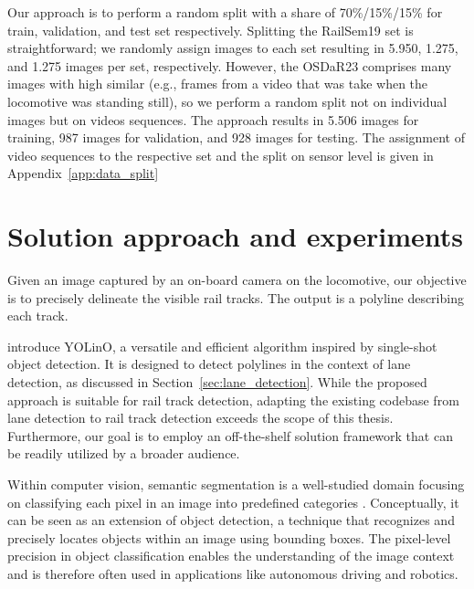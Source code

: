\documentclass[Master,MDS,english]{BASE/twbook} %
\begin{document}
Our approach is to perform a random split with a share of 70\%/15\%/15\% for train, validation, and test set respectively. Splitting the RailSem19 set is straightforward; we randomly assign images to each set resulting in 5.950, 1.275, and 1.275 images per set, respectively. However, the OSDaR23 comprises many images with high similar (e.g., frames from a video that was take when the locomotive was standing still), so we perform a random split not on individual images but on videos sequences. The approach results in 5.506 images for training, 987 images for validation, and 928 images for testing.
The assignment of video sequences to the respective set and the split on sensor level is given in Appendix~\ref{app:data_split}



\chapter{Solution approach and experiments} %

Given an image captured by an on-board camera on the locomotive, our objective is to precisely delineate the visible rail tracks. The output is  a polyline describing each track.

\cite{meyer2021yolino} introduce YOLinO, a versatile and efficient algorithm inspired by single-shot object detection. It is designed to detect polylines in the context of lane detection, as discussed in Section~\ref{sec:lane_detection}. While the proposed approach is suitable for rail track detection, adapting the existing codebase from lane detection to rail track detection exceeds the scope of this thesis. Furthermore, our goal is to employ an off-the-shelf solution framework that can be readily utilized by a broader audience.


Within computer vision, semantic segmentation is a well-studied domain focusing on classifying each pixel in an image into predefined categories \citep{MO2022626}. Conceptually, it 
can be seen as an extension of object detection, a technique that recognizes and precisely locates objects within an image using bounding boxes.
The pixel-level precision in object classification enables the understanding of the image context and is therefore often used in applications like autonomous driving and robotics.
\end{document}
